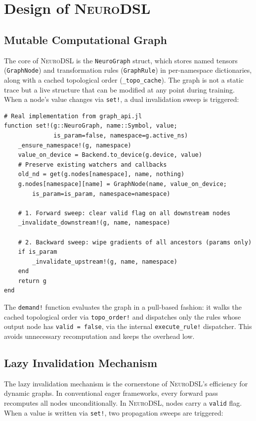 \documentclass{article}
\begin{document}
\section{Design of \textsc{NeuroDSL}}
\label{sec:design}

\subsection{Mutable Computational Graph}
The core of \textsc{NeuroDSL} is the \texttt{NeuroGraph} struct, which stores named tensors (\texttt{GraphNode}) and transformation rules (\texttt{GraphRule}) in per-namespace dictionaries, along with a cached topological order (\texttt{\_topo\_cache}). The graph is not a static trace but a live structure that can be modified at any point during training. When a node's value changes via \texttt{set!}, a dual invalidation sweep is triggered:

\begin{lstlisting}[caption={Core dynamic mechanism: set! triggers dual invalidation sweeps}, label={lst:lazy_invalidation}]
# Real implementation from graph_api.jl
function set!(g::NeuroGraph, name::Symbol, value;
              is_param=false, namespace=g.active_ns)
    _ensure_namespace!(g, namespace)
    value_on_device = Backend.to_device(g.device, value)
    # Preserve existing watchers and callbacks
    old_nd = get(g.nodes[namespace], name, nothing)
    g.nodes[namespace][name] = GraphNode(name, value_on_device;
        is_param=is_param, namespace=namespace)

    # 1. Forward sweep: clear valid flag on all downstream nodes
    _invalidate_downstream!(g, name, namespace)

    # 2. Backward sweep: wipe gradients of all ancestors (params only)
    if is_param
        _invalidate_upstream!(g, name, namespace)
    end
    return g
end
\end{lstlisting}

The \texttt{demand!} function evaluates the graph in a pull-based fashion: it walks the cached topological order via \texttt{topo\_order!} and dispatches only the rules whose output node has \texttt{valid = false}, via the internal \texttt{execute\_rule!} dispatcher. This avoids unnecessary recomputation and keeps the overhead low.

\subsection{Lazy Invalidation Mechanism}
\label{sec:lazy}
The lazy invalidation mechanism is the cornerstone of \textsc{NeuroDSL}'s efficiency for dynamic graphs. In conventional eager frameworks, every forward pass recomputes all nodes unconditionally. In \textsc{NeuroDSL}, nodes carry a \texttt{valid} flag. When a value is written via \texttt{set!}, two propagation sweeps are triggered:
\end{document}
